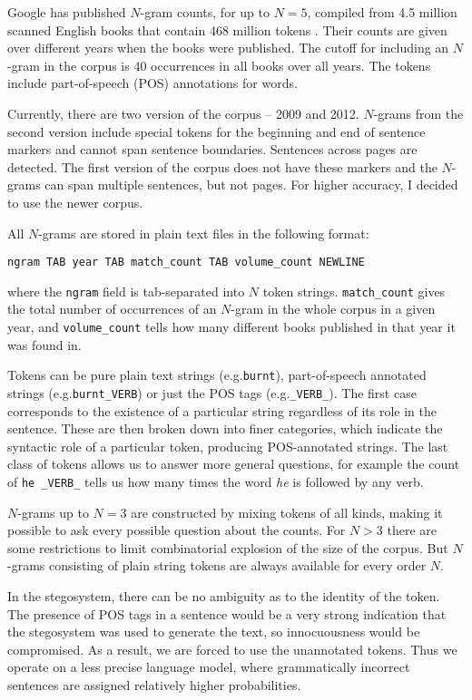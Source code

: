 \documentclass[draft]{IIBproject}
\makeatletter
\DeclareRobustCommand*{\eg}{e.g.\@\xspace}
\makeatother
\begin{document}
Google has published $N$-gram counts, for up to $N=5$, compiled from 4.5 million scanned English books that contain 468 million tokens \cite{googlengrams2011, lin2012paper}. Their counts are given over different years when the books were published. The cutoff for including an $N$-gram in the corpus is $40$ occurrences in all books over all years. The tokens include part-of-speech (POS) annotations for words.

Currently, there are two version of the corpus -- 2009 and 2012. $N$-grams from the second version include special tokens for the beginning and end of sentence markers and cannot span sentence boundaries. Sentences across pages are detected. The first version of the corpus does not have these markers and the $N$-grams can span multiple sentences, but not pages. For higher accuracy, I decided to use the newer corpus.

All $N$-grams are stored in plain text files in the following format:

\centerline{\texttt{ngram TAB year TAB match\_count TAB volume\_count NEWLINE}}

where the \texttt{ngram} field is tab-separated into $N$ token strings. \texttt{match\_count} gives the total number of occurrences of an $N$-gram in the whole corpus in a given year, and \texttt{volume\_count} tells how many different books published in that year it was found in.

Tokens can be pure plain text strings (\eg \texttt{burnt}), part-of-speech annotated strings (\eg \texttt{burnt\_VERB}) or just the POS tags (\eg \texttt{\_VERB\_}). The first case corresponds to the existence of a particular string regardless of its role in the sentence. These are then broken down into finer categories, which indicate the syntactic role of a particular token, producing POS-annotated strings. The last class of tokens allows us to answer more general questions, for example the count of \mbox{\texttt{he \_VERB\_}} tells us how many times the word \emph{he} is followed by any verb.

$N$-grams up to $N=3$ are constructed by mixing tokens of all kinds, making it possible to ask every possible question about the counts. For $N > 3$ there are some restrictions to limit combinatorial explosion of the size of the corpus. But $N$-grams consisting of plain string tokens are always available for every order $N$.

In the stegosystem, there can be no ambiguity as to the identity of the token. The presence of POS tags in a sentence would be a very strong indication that the stegosystem was used to generate the text, so innocuousness would be compromised. As a result, we are forced to use the unannotated tokens. Thus we operate on a less precise language model, where grammatically incorrect sentences are assigned relatively higher probabilities.
\end{document}
